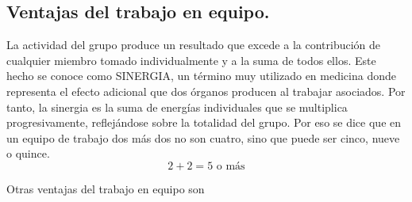 \subsection{Ventajas del trabajo en equipo.}
La actividad del grupo produce un resultado que excede a la contribución de cualquier miembro
tomado individualmente y a la suma de todos ellos. Este hecho se conoce como SINERGIA, un
término muy utilizado en medicina donde representa el efecto adicional que dos órganos
producen al trabajar asociados. Por tanto, la sinergia es la suma de energías individuales que
se multiplica progresivamente, reflejándose sobre la totalidad del grupo. Por eso se dice que en
un equipo de trabajo dos más dos no son cuatro, sino que puede ser cinco, nueve o quince.
\begin{equation*}
    2 + 2 = 5 \text{ o más}
\end{equation*}

Otras ventajas del trabajo en equipo son

